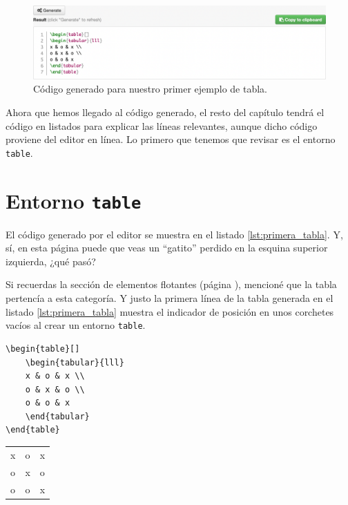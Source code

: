 \begin{figure}[ht!]
	\centering
	\includegraphics[width=\linewidth]{img/table_gatito_codigo_300ppi.png}
	\caption{Código generado para nuestro primer ejemplo de tabla.}
	\label{fig:table_gatito_codigo}
\end{figure}

Ahora que hemos llegado al código generado, el resto del capítulo tendrá el código en listados para explicar las líneas relevantes, aunque dicho código proviene del editor en línea. Lo primero que tenemos que revisar es el entorno \texttt{table}.


\section{Entorno \texttt{table}}
\label{sec:entorno_table}


El código generado por el editor se muestra en el listado \ref{lst:primera_tabla}. Y, sí, en esta página puede que veas un ``gatito'' perdido en la esquina superior izquierda, ¿qué pasó?

Si recuerdas la sección de elementos flotantes (página \pageref{sub:elementos_flotantes}), mencioné que la tabla pertencía a esta categoría. Y justo la primera línea de la tabla generada en el listado \ref{lst:primera_tabla} muestra el indicador de posición en unos corchetes vacíos al crear un entorno \texttt{table}.

\begin{lstlisting}[style=latex,caption={Código de primera tabla generada.},label=lst:primera_tabla]
\begin{table}[]
	\begin{tabular}{lll}
	x & o & x \\
	o & x & o \\
	o & o & x
	\end{tabular}
\end{table}
\end{lstlisting}

\begin{table}[]
	\begin{tabular}{lll}
	x & o & x \\
	o & x & o \\
	o & o & x
	\end{tabular}
\end{table}

